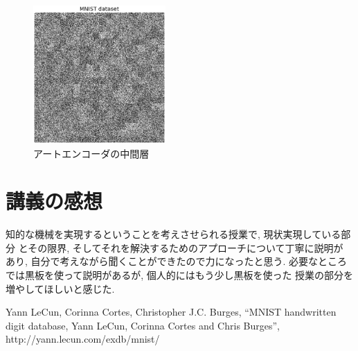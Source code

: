 \documentclass[10pt,a4paper,twocolumn]{jarticle}
\begin{document}
\begin{figure}[htbp]
  \centering
  \includegraphics[width=0.45\textwidth]{assets/img/tiled_autoencoder_hidden_mnist.eps}
  \caption{アートエンコーダの中間層}
  \label{fig:autoencoder-hidden}
\end{figure}

\section{講義の感想}
知的な機械を実現するということを考えさせられる授業で, 現状実現している部分
とその限界, そしてそれを解決するためのアプローチについて丁寧に説明が
あり, 自分で考えながら聞くことができたので力になったと思う. 
必要なところでは黒板を使って説明があるが, 個人的にはもう少し黒板を使った
授業の部分を増やしてほしいと感じた. 


\begin{thebibliography}{9}
   Yann LeCun, Corinna Cortes, Christopher J.C. Burges,
    ``MNIST handwritten digit database, Yann LeCun, Corinna Cortes and Chris Burges'',
    http://yann.lecun.com/exdb/mnist/
\end{thebibliography}

\end{document}
